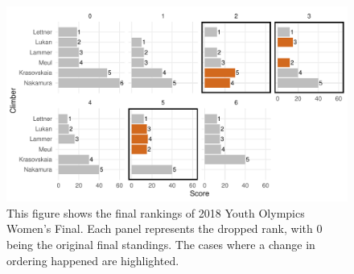 \documentclass[12pt]{article}
\begin{document}
\begin{figure}[H]
\centering
\includegraphics{draft_files/figure-latex/unnamed-chunk-13-1.pdf}
\caption{This figure shows the final rankings of 2018 Youth Olympics
Women's Final. Each panel represents the dropped rank, with 0 being the
original final standings. The cases where a change in ordering happened
are highlighted.}
\end{figure}



\end{document}
